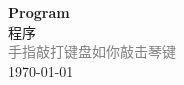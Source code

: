 \vspace*{\fill}
\begin{center}
    \textcolor{orange!50}{\Huge\textbf{Program}} \\[1em]
    \textcolor{orange!60!pink}{\Large 程序} \\[2em]
    \textcolor{gray}{\large 手指敲打键盘如你敲击琴键} \\[1em]
    \today
\end{center}
\vspace*{\fill}
\clearpage


\clearpage

\clearpage




